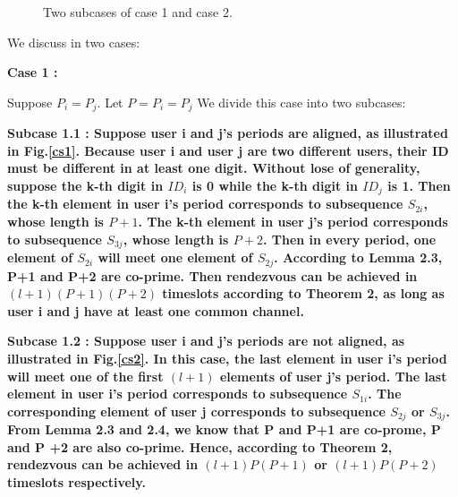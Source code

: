 \documentclass[10pt, conference, letterpaper]{IEEEtran}
\begin{document}
\begin{figure}
\centering
{}
\caption{Two subcases of case 1 and case 2.}
\label{case}
\end{figure}



\begin{IEEEproof}
We discuss in two cases:

\bfseries Case 1 \mdseries:

 Suppose $P_i = P_j$. Let $P = P_i =P_j$ We divide this case into two subcases:

\bfseries Subcase 1.1 \mdseries: Suppose user i and j's periods are aligned, as illustrated in Fig.\ref{cs1}. Because user i and user j are two different users, their ID must be different in at least one digit. Without lose of generality, suppose the k-th digit in $ID_i$ is 0 while the k-th digit in $ID_j$ is 1. Then the k-th element in user i's period corresponds to subsequence $S_{2i}$, whose length is $P+1$. The k-th element in user j's period corresponds to subsequence $S_{3j}$, whose length is $P+2$. Then in every period, one element of $S_{2i}$ will meet one element of $S_{2j}$. According to Lemma 2.3, P+1 and P+2 are co-prime. Then rendezvous can be achieved in $(l+ 1)(P+1)(P+2)$ timeslots according to Theorem 2, as long as user i and j have at least one common channel.

\bfseries Subcase 1.2 \mdseries: Suppose user i and j's periods are not aligned, as illustrated in Fig.\ref{cs2}. In this case, the last element in user i's period will meet one of the first $(l + 1)$ elements of user j's period. The last element in user i's period corresponds to subsequence $S_{1i}$. The corresponding element of user j corresponds to subsequence $S_{2j}$ or $S_{3j}$. From Lemma 2.3 and 2.4, we know that P and P+1 are co-prome, P and P +2 are also co-prime. Hence, according to Theorem 2, rendezvous can be achieved in $(l + 1)P(P+1)$ or $(l + 1)P(P+2)$ timeslots respectively.


\end{IEEEproof}
\end{document}

